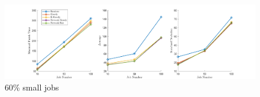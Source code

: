 \begin{figure}[bth]
\includegraphics[width=1\textwidth]{figure/60.png}
\centering
\caption{60\% small jobs} \label{fig-60}
\end{figure}